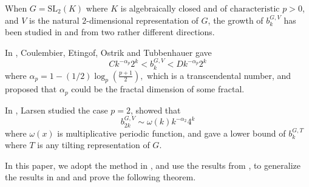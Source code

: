 \documentclass[11 pt]{amsart}
\theoremstyle{plain}
\theoremstyle{definition}
\theoremstyle{remark}
\def\C{\mathbb{C}}
\def\SL{\text{SL}}
\def\xx{\otimes}
\def\ch{\text{characteristic}}
\begin{document}


When $G=\SL_2(K)$ where $K$ is algebraically closed and of $\ch$ $p>0$, and $V$ is the natural $2$-dimensional representation of $G$, the growth of $b_k^{G, V}$ has been studied in \cite{coulembier2024fractalbehaviortensorpowers} and \cite{larsen2024boundsmathrmsl2indecomposablestensorpowers} from two rather different directions. 

In \cite{coulembier2024fractalbehaviortensorpowers}, Coulembier, Etingof, Ostrik and
Tubbenhauer gave \begin{equation} \label{formofbounds}
    Ck^{-\alpha_p}2^k < b_k^{G, V}< D k^{-\alpha_p}2^k
\end{equation}
where $\alpha_p=1-(1/2)\log_p(\frac{p+1}{2}),$ which is a transcendental number, and proposed that $\alpha_p$ could be the fractal dimension of some fractal. 


In \cite{larsen2024boundsmathrmsl2indecomposablestensorpowers}, Larsen studied the case $p=2$, showed that $$b_{2k}^{G, V}\sim \omega(k)k^{-\alpha_2} 4^k$$ where  $\omega(x)$ is multiplicative periodic function,  and gave a lower bound of $b_k^{G, T}$ where $T$ is any tilting representation of $G$.

In this paper, we adopt the method in \cite{larsen2024boundsmathrmsl2indecomposablestensorpowers}, and use the  results from \cite{coulembier2024fractalbehaviortensorpowers}, to generalize  the results in \cite{coulembier2024fractalbehaviortensorpowers} and \cite{larsen2024boundsmathrmsl2indecomposablestensorpowers} and prove the following theorem.
\end{document}
